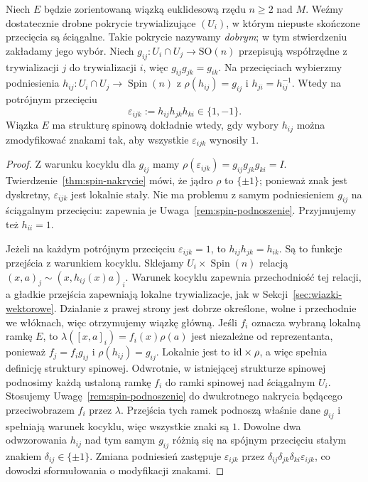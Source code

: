 \begin{stwierdzenie}
\label{prop:w2-znaki}
Niech $E$ będzie zorientowaną wiązką euklidesową
rzędu $n\geq2$ nad $M$. Weźmy dostatecznie drobne
pokrycie trywializujące $(U_i)$, w którym
niepuste skończone przecięcia są ściągalne. Takie pokrycie
nazywamy \emph{dobrym}; w tym stwierdzeniu zakładamy jego wybór.
Niech $g_{ij}:U_i\cap U_j\to\mathrm{SO}(n)$
przepisują współrzędne z trywializacji $j$ do trywializacji $i$,
więc $g_{ij}g_{jk}=g_{ik}$.
Na przecięciach wybierzmy podniesienia
$h_{ij}:U_i\cap U_j\to\operatorname{Spin}(n)$
z $\rho(h_{ij})=g_{ij}$ i $h_{ji}=h_{ij}^{-1}$.
Wtedy na potrójnym przecięciu
\begin{equation}\label{eq:w2-znaki}
 \varepsilon_{ijk}:=h_{ij}h_{jk}h_{ki}
          \in\{1,-1\}.
\end{equation}
Wiązka $E$ ma strukturę spinową dokładnie wtedy,
gdy wybory $h_{ij}$ można zmodyfikować znakami
tak, aby wszystkie $\varepsilon_{ijk}$ wynosiły $1$.
\end{stwierdzenie}
\begin{proof}
Z warunku kocyklu dla $g_{ij}$ mamy
$\rho(\varepsilon_{ijk})
=g_{ij}g_{jk}g_{ki}=I$.
Twierdzenie~\ref{thm:spin-nakrycie} mówi, że
jądro $\rho$ to $\{\pm1\}$; ponieważ znak jest
dyskretny, $\varepsilon_{ijk}$ jest lokalnie stały.
Nie ma problemu z samym podniesieniem
$g_{ij}$ na ściągalnym przecięciu:
zapewnia je Uwaga~\ref{rem:spin-podnoszenie}.
Przyjmujemy też $h_{ii}=1$.

Jeżeli na każdym potrójnym przecięciu
$\varepsilon_{ijk}=1$, to
$h_{ij}h_{jk}=h_{ik}$.
Są to funkcje przejścia z warunkiem kocyklu.
Sklejamy $U_i\times\operatorname{Spin}(n)$ relacją
$(x,a)_j\sim(x,h_{ij}(x)a)_i$. Warunek kocyklu zapewnia
przechodniość tej relacji, a gładkie przejścia zapewniają lokalne
trywializacje, jak w Sekcji~\ref{sec:wiazki-wektorowe}.
Działanie z prawej strony jest dobrze określone, wolne
i przechodnie we włóknach, więc otrzymujemy wiązkę główną.
Jeśli $f_i$ oznacza wybraną lokalną ramkę $E$, to
$\lambda([x,a]_i)=f_i(x)\rho(a)$ jest niezależne od reprezentanta,
ponieważ $f_j=f_i g_{ij}$ i $\rho(h_{ij})=g_{ij}$.
Lokalnie jest to $\mathrm{id}\times\rho$, a więc spełnia definicję
struktury spinowej.
Odwrotnie, w istniejącej strukturze spinowej podnosimy każdą
ustaloną ramkę $f_i$ do ramki spinowej nad ściągalnym $U_i$.
Stosujemy Uwagę~\ref{rem:spin-podnoszenie} do dwukrotnego
nakrycia będącego przeciwobrazem $f_i$ przez $\lambda$.
Przejścia tych ramek podnoszą właśnie dane $g_{ij}$ i spełniają
warunek kocyklu, więc wszystkie znaki są $1$.
Dowolne dwa odwzorowania $h_{ij}$ nad
tym samym $g_{ij}$ różnią się na spójnym
przecięciu stałym znakiem
$\delta_{ij}\in\{\pm1\}$.
Zmiana podniesień zastępuje
$\varepsilon_{ijk}$ przez
$\delta_{ij}\delta_{jk}\delta_{ki}
\varepsilon_{ijk}$, co dowodzi
sformułowania o modyfikacji znakami.
\end{proof}


